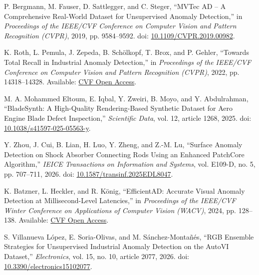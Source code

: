 P. Bergmann, M. Fauser, D. Sattlegger, and C. Steger,
``MVTec AD -- A Comprehensive Real-World Dataset for
Unsupervised Anomaly Detection,''
in \textit{Proceedings of the IEEE/CVF Conference on
    Computer Vision and Pattern Recognition (CVPR)},
2019, pp. 9584--9592.
doi: \href{https://doi.org/10.1109/CVPR.2019.00982}
{10.1109/CVPR.2019.00982}.

K. Roth, L. Pemula, J. Zepeda, B. Sch\"olkopf,
T. Brox, and P. Gehler,
``Towards Total Recall in Industrial Anomaly Detection,''
in \textit{Proceedings of the IEEE/CVF Conference on
    Computer Vision and Pattern Recognition (CVPR)},
2022, pp. 14318--14328.
Available:
\href{https://openaccess.thecvf.com/content/CVPR2022/html/Roth_Towards_Total_Recall_in_Industrial_Anomaly_Detection_CVPR_2022_paper.html}
{CVF Open Access}.

M. A. Mohammed Eltoum, E. Iqbal, Y. Zweiri,
B. Moyo, and Y. Abdulrahman,
``BladeSynth: A High-Quality Rendering-Based Synthetic
Dataset for Aero Engine Blade Defect Inspection,''
\textit{Scientific Data}, vol. 12, article 1268, 2025.
doi:
\href{https://doi.org/10.1038/s41597-025-05563-y}
{10.1038/s41597-025-05563-y}.

Y. Zhou, J. Cui, B. Lian, H. Luo, Y. Zheng,
and Z.-M. Lu,
``Surface Anomaly Detection on Shock Absorber Connecting
Rods Using an Enhanced PatchCore Algorithm,''
\textit{IEICE Transactions on Information and Systems},
vol. E109-D, no. 5, pp. 707--711, 2026.
doi:
\href{https://doi.org/10.1587/transinf.2025EDL8047}
{10.1587/transinf.2025EDL8047}.

K. Batzner, L. Heckler, and R. K\"onig,
``EfficientAD: Accurate Visual Anomaly Detection at
Millisecond-Level Latencies,''
in \textit{Proceedings of the IEEE/CVF Winter Conference
    on Applications of Computer Vision (WACV)},
2024, pp. 128--138.
Available:
\href{https://openaccess.thecvf.com/content/WACV2024/html/Batzner_EfficientAD_Accurate_Visual_Anomaly_Detection_at_Millisecond-Level_Latencies_WACV_2024_paper.html}
{CVF Open Access}.

S. Villanueva L\'opez, E. Soria-Olivas,
and M. S\'anchez-Monta\~n\'es,
``RGB Ensemble Strategies for Unsupervised Industrial
Anomaly Detection on the AutoVI Dataset,''
\textit{Electronics}, vol. 15, no. 10,
article 2077, 2026.
doi:
\href{https://doi.org/10.3390/electronics15102077}
{10.3390/electronics15102077}.

